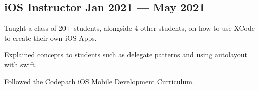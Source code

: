 \subsection{{iOS Instructor \hfill Jan 2021 --- May 2021}}
\begin{zitemize}
\item Taught a class of 20+ students, alongside 4 other students, on how to use XCode to create their own iOS Apps.
\item Explained concepts to students such as delegate patterns and using autolayout with swift.
\item Followed the \href{https://www.codepath.org/courses/ios-mobile-development}{Codepath iOS Mobile Development Curriculum}.
\end{zitemize}

